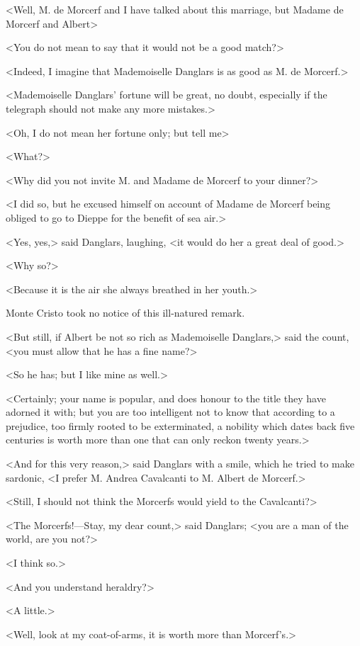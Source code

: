  <Well, M. de Morcerf and I have talked about this marriage, but Madame de Morcerf and Albert\longdash> 

 <You do not mean to say that it would not be a good match?> 

 <Indeed, I imagine that Mademoiselle Danglars is as good as M. de Morcerf.> 

 <Mademoiselle Danglars' fortune will be great, no doubt, especially if the telegraph should not make any more mistakes.> 

 <Oh, I do not mean her fortune only; but tell me\longdash> 

 <What?> 

 <Why did you not invite M. and Madame de Morcerf to your dinner?> 

 <I did so, but he excused himself on account of Madame de Morcerf being obliged to go to Dieppe for the benefit of sea air.> 

 <Yes, yes,> said Danglars, laughing, <it would do her a great deal of good.> 

 <Why so?> 

 <Because it is the air she always breathed in her youth.> 

 Monte Cristo took no notice of this ill-natured remark. 

 <But still, if Albert be not so rich as Mademoiselle Danglars,> said the count, <you must allow that he has a fine name?> 

 <So he has; but I like mine as well.> 

 <Certainly; your name is popular, and does honour to the title they have adorned it with; but you are too intelligent not to know that according to a prejudice, too firmly rooted to be exterminated, a nobility which dates back five centuries is worth more than one that can only reckon twenty years.> 

 <And for this very reason,> said Danglars with a smile, which he tried to make sardonic, <I prefer M. Andrea Cavalcanti to M. Albert de Morcerf.> 

 <Still, I should not think the Morcerfs would yield to the Cavalcanti?> 

 <The Morcerfs!—Stay, my dear count,> said Danglars; <you are a man of the world, are you not?> 

 <I think so.> 

 <And you understand heraldry?> 

 <A little.> 

 <Well, look at my coat-of-arms, it is worth more than Morcerf's.> 

